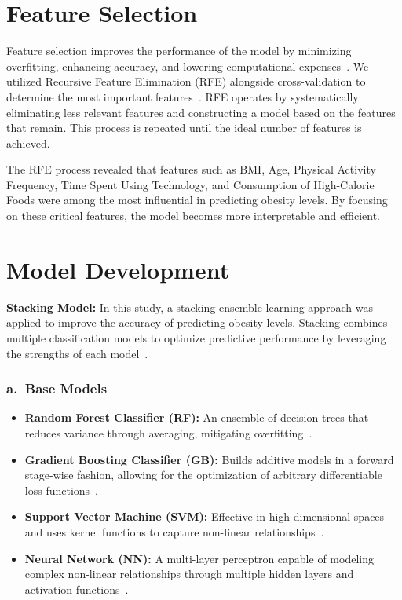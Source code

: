 \documentclass[12pt, a4paper]{article}
\begin{document}
\section{Feature Selection}

Feature selection improves the performance of the model by minimizing overfitting,
enhancing accuracy, and lowering computational expenses~\cite{kohavi1997}. We utilized
Recursive Feature Elimination (RFE) alongside cross-validation to determine the most
important features~\cite{guyon2002,kohavi1997}. RFE operates by systematically
eliminating less relevant features and constructing a model based on the features that
remain. This process is repeated until the ideal number of features is achieved.

The RFE process revealed that features such as BMI, Age, Physical Activity Frequency,
Time Spent Using Technology, and Consumption of High-Calorie Foods were among the most
influential in predicting obesity levels. By focusing on these critical features, the
model becomes more interpretable and efficient.

\section{Model Development}

\textbf{Stacking Model:} In this study, a stacking ensemble learning approach was
applied to improve the accuracy of predicting obesity levels. Stacking combines multiple
classification models to optimize predictive performance by leveraging the strengths of
each model~\cite{breiman1996,friedman2001}.

\subsubsection*{a.\ Base Models}

\begin{itemize}
  \item \textbf{Random Forest Classifier (RF):} An ensemble of decision trees that
        reduces variance through averaging, mitigating overfitting~\cite{breiman1996}.
  \item \textbf{Gradient Boosting Classifier (GB):} Builds additive models in a
        forward stage-wise fashion, allowing for the optimization of arbitrary
        differentiable loss functions~\cite{friedman2001,ferdowsy2021}.
  \item \textbf{Support Vector Machine (SVM):} Effective in high-dimensional spaces and
        uses kernel functions to capture non-linear relationships~\cite{cortes1995}.
  \item \textbf{Neural Network (NN):} A multi-layer perceptron capable of modeling
        complex non-linear relationships through multiple hidden layers and activation
        functions~\cite{bishop1995,rumelhart1986}.
\end{itemize}
\end{document}
